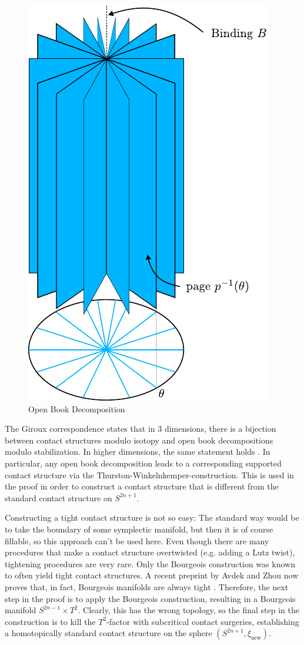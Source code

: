 \begin{figure}
    \includegraphics{../images/open_book.pdf}
    \caption{Open Book Decomposition}
    \label{fig:open_book}
\end{figure}

The Giroux correspondence states that in 3 dimensions, there is a bijection between contact structures modulo isotopy
and open book decompositions modulo stabilization.
In higher dimensions, the same statement holds \cite{BHH23}. 
In particular, any open book decomposition leads to a corresponding supported
contact structure via the Thurston-Winkelnkemper-construction.
This is used in the proof in order to construct a contact structure that is different from the standard contact structure on $S^{2n+1}$.

Constructing a tight contact structure is not so easy: The standard way would be to take the boundary of some symplectic manifold,
but then it is of course fillable, so this approach can't be used here.
Even though there are many procedures that make a contact structure overtwisted (e.g. adding a Lutz twist), tightening procedures are very rare.
Only the Bourgeois construction was known to often yield tight contact structures. 
A recent preprint by Avdek and Zhou now proves that, in fact, Bourgeois manifolds are always tight \cite{BGM22, AZ24}.
Therefore, the next step in the proof is to apply the Bourgeois construction, resulting in a Bourgeois manifold $S^{2n-1} \times T^2$.
Clearly, this has the wrong topology, so the final step in the construction is to kill the $T^2$-factor with
subcritical contact surgeries, establishing a homotopically standard contact structure on the sphere $(S^{2n+1},\xi_\text{new})$.

